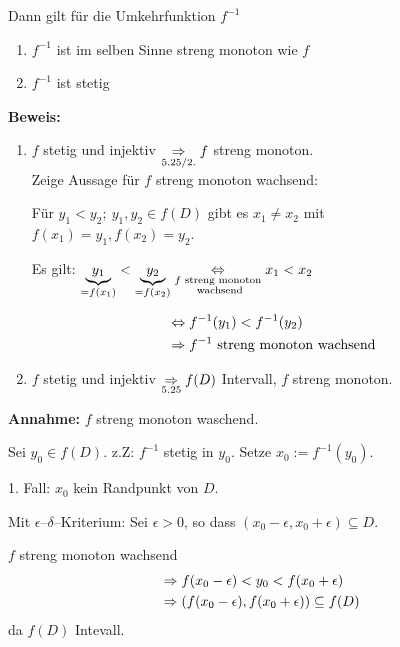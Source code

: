 \documentclass[10pt, a4paper, fleqn]{article}
\begin{document}
Dann gilt für die Umkehrfunktion $f^{-1}$
\begin{enumerate}[1.]
    \item $f^{-1}$ ist im selben Sinne streng monoton wie $f$
    \item $f^{-1}$ ist stetig
\end{enumerate}

\textbf{Beweis: }
\begin{enumerate}[1.]
    \item $f$ stetig und injektiv $\underset{5.25/2.}{\Rightarrow} f$ streng monoton. \\
    Zeige Aussage für $f$ streng monoton wachsend:

    Für $y_1 < y_2; \ y_1, y_2 \in f(D)$ gibt es $x_1 \neq x_2$ mit \\
    $f(x_1) = y_1, f(x_2) = y_2$.

    Es gilt: $\underbrace{y_1}_{= f(x_1)} < \underbrace{y_2}_{= f(x_2)} 
    \underset{\substack{f \text{ streng monoton} \\ \text{ wachsend}}}{\Leftrightarrow} x_1 < x_2$

    \[\begin{aligned}
        &\Leftrightarrow f^{-1}(y_1) < f^{-1}(y_2) \\
        &\Rightarrow f^{-1} \text{ streng monoton wachsend}
    \end{aligned}\]

    \item $f$ stetig und injektiv $\underset{5.25}{\Rightarrow} f(D)$ Intervall, 
    $f$ streng monoton.
\end{enumerate}

\textbf{Annahme: } $f$ streng monoton waschend.

Sei $y_0 \in f(D)$. z.Z: $f^{-1}$ stetig in $y_0$.
Setze $x_0 := f^{-1}(y_0)$.

1. Fall: $x_0$ kein Randpunkt von $D$. 

Mit $\epsilon$--$\delta$--Kriterium:
Sei $\epsilon > 0$, so dass $(x_0 - \epsilon, x_0 + \epsilon) \subseteq D$.

$f$ streng monoton wachsend
\[\begin{aligned}
    &\Rightarrow f(x_0 - \epsilon) < y_0 < f(x_0 + \epsilon) \\
    &\Rightarrow (f(x_0 - \epsilon), f(x_0 + \epsilon)) \subseteq f(D)
\end{aligned}\]
da $f(D)$ Intevall.

\end{document}
